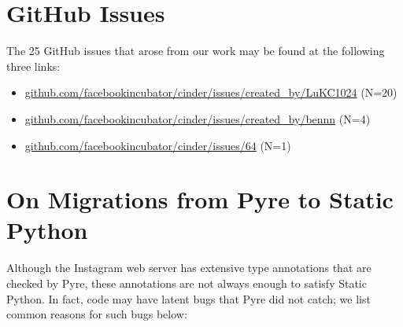 \documentclass[english,cleveref,submission]{programming}
\newcommand{\shorturl}[2]{\href{#1#2}{#2}}
\newcommand{\SP}{Static Python}
\begin{document}
%

{\sloppy
\printbibliography
}

\appendix

\section{GitHub Issues}
\label{a:github-issues}

The 25 GitHub issues that arose from our work may be found at the following three links:

\begin{itemize}
  \item \shorturl{https://}{github.com/facebookincubator/cinder/issues/created\_by/LuKC1024} (N=20)
  \item \shorturl{https://}{github.com/facebookincubator/cinder/issues/created\_by/bennn} (N=4)
  \item \shorturl{https://}{github.com/facebookincubator/cinder/issues/64} (N=1)
\end{itemize}


\section{On Migrations from Pyre to \SP{}}
\label{a:pyre-limits}

Although the Instagram web server has extensive type annotations that are
checked by Pyre,
these annotations are not always enough to satisfy \SP{}.
In fact, code may have latent bugs that Pyre did not catch;
we list common reasons for such bugs below:
\end{document}
